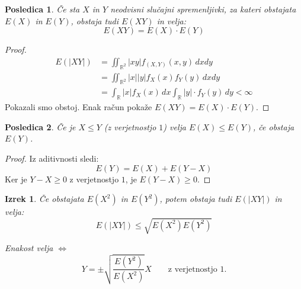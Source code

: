 \documentclass[12pt]{book}
\def\n{\noindent}
\theoremstyle{definition}
\theoremstyle{plain}
\newtheorem{izrek}{Izrek}
\theoremstyle{plain}
\theoremstyle{plain}
\newtheorem{posledica}{Posledica}
\theoremstyle{remark}
\begin{document}
\begin{posledica}
    Če sta $X$ in $Y$ neodvisni slučajni spremenljivki, za kateri obstajata $E(X)$ in $E(Y)$, obstaja tudi $E(XY)$ in velja: 
    $$
    E(X Y)=E(X) \cdot E(Y)
    $$
\end{posledica}

\begin{proof}
    $$
    \begin{aligned}
        E(|X Y|)&=\iint_{\mathbb{R}^2}|x y| f_{(X, Y)}(x, y) \, d x d y \\
        &=\iint_{\mathbb{R}^2}|x| |y| f_X(x) f_Y(y) \,d x d y \\
        &=\int_{\mathbb{R}}|x|  f_X(x) \, d x  \int_{\mathbb{R}}|y| \cdot f_Y(y) \,d y<\infty
    \end{aligned}
    $$
    Pokazali smo obstoj. Enak račun pokaže $E(X Y)=E(X) \cdot E(Y)$.
\end{proof}

\begin{posledica}
    Če je $X \leq Y$ (z verjetnostjo $1$) velja $E(X) \leq E(Y)$, če obstaja $E(Y)$.
\end{posledica}

\begin{proof}
    Iz aditivnosti sledi: 
    $$
    E(Y)=E(X)+E(Y-X)
    $$
    Ker je $Y-X \geq 0$ z verjetnostjo $1$, je $E(Y-X) \geq 0$.
\end{proof}

\begin{izrek}
    Če obstajata $E\left(X^2\right)$ in $E\left(Y^2\right)$, potem obstaja tudi $E(|X Y|)$ in velja: 
    $$
    E(|X Y|) \leq \sqrt{E\left(X^2\right) E\left(Y^2\right)}
    $$
    
    \n Enakost velja $\iff$ 
    $$
    Y=\pm \sqrt{\frac{E\left(Y^2\right)}{E\left(X^2\right)}} X \qquad \text{z verjetnostjo $1$.}
    $$ 
\end{izrek}
\end{document}
